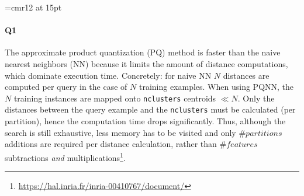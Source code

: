 \documentclass[10pt]{article}
\begin{document}
\font\myfont=cmr12 at 15pt

\title{\vspace{-2.5cm}{\myfont Assignment 3: BDAP [B-KUL-H00Y4A]}}
\date{} %


\maketitle

\vspace{-2cm}
\paragraph{Q1}
The approximate product quantization (PQ) method is faster than the naive nearest neighbors (NN) because it limits the amount of distance computations, which dominate execution time. Concretely: for naive NN $N$ distances are computed per query in the case of $N$ training examples. When using PQNN, the $N$ training instances are mapped onto \texttt{nclusters} centroids $\ll N$. Only the distances between the query example and the \texttt{nclusters} must be calculated (per partition), hence the computation time drops significantly. Thus, although the search is still exhaustive, less memory has to be visited and only $\# partitions$ additions are required per distance calculation, rather than $\# features$ subtractions \textit{and} multiplications\footnote{\url{https://hal.inria.fr/inria-00410767/document/}}.
%

\vspace{-.3cm}
\end{document}
